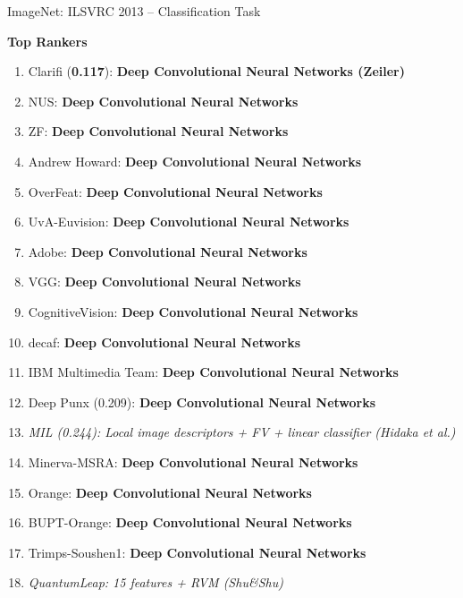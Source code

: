\documentclass{beamer}
\begin{document}
\begin{frame}{ImageNet: ILSVRC 2013 -- Classification Task}


    \vspace{2mm}
    {\bf Top Rankers}
    {\small
    \begin{enumerate}
        \itemsep 0em
        \item Clarifi ({\bf 0.117}): {\bf Deep Convolutional Neural Networks
            {\scriptsize (Zeiler)}}
        \item NUS: {\bf Deep Convolutional Neural Networks}
        \item ZF: {\bf Deep Convolutional Neural Networks}
        \item Andrew Howard: {\bf Deep Convolutional Neural
            Networks}
        \item OverFeat: {\bf Deep Convolutional Neural
            Networks}
        \item UvA-Euvision: {\bf Deep Convolutional Neural
            Networks}
        \item Adobe: {\bf Deep Convolutional Neural
            Networks}
        \item VGG: {\bf Deep Convolutional Neural Networks}
        \item CognitiveVision: {\bf Deep Convolutional
            Neural Networks}
        \item decaf: {\bf Deep Convolutional Neural
            Networks}
        \item IBM Multimedia Team: {\bf Deep Convolutional
            Neural Networks}
        \item Deep Punx (0.209): {\bf Deep Convolutional Neural
            Networks}
        \item {\it MIL (0.244): Local image descriptors + FV + linear
            classifier {\small (Hidaka et al.)}}
        \item Minerva-MSRA: {\bf Deep Convolutional Neural
            Networks}
        \item Orange: {\bf Deep Convolutional Neural
            Networks}
        \item BUPT-Orange: {\bf Deep Convolutional Neural
            Networks}
        \item Trimps-Soushen1: {\bf Deep Convolutional
            Neural Networks}
        \item {\it QuantumLeap: 15 features + RVM {\small
            (Shu\&Shu)}}
    \end{enumerate}
    }


\end{frame}
\end{document}
